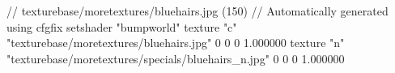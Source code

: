 // texturebase/moretextures/bluehairs.jpg (150)
// Automatically generated using cfgfix
setshader "bumpworld"
texture "c" "texturebase/moretextures/bluehairs.jpg" 0 0 0 1.000000
texture "n" "texturebase/moretextures/specials/bluehairs_n.jpg" 0 0 0 1.000000
